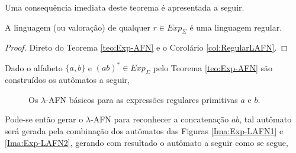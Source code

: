 Uma consequência imediata deste teorema é apresentada a seguir.

\begin{corollary}
	A linguagem (ou valoração) de qualquer $r \in Exp_\Sigma$ é uma linguagem regular.
\end{corollary}

\begin{proof}
	Direto do Teorema \ref{teo:Exp-AFN} e o Corolário \ref{col:RegularLAFN}.
\end{proof}

\begin{example}\label{exe:Expressao-AFN}
	Dado o alfabeto $\{a,b\}$ e $(ab)^* \in Exp_\Sigma$  pelo Teorema \ref{teo:Exp-AFN} são construídos os autômatos a seguir,
	
	\begin{figure}[h]
		\centering
		\hfill
		\caption{Os $\lambda$-AFN básicos para as expressões regulares primitivas $a$ e $b$.}
		\label{fig:LAFD-basicos1}
	\end{figure}
	
	Pode-se então gerar o $\lambda$-AFN para reconhecer a concatenação $ab$, tal autômato será gerada pela combinação dos autômatos das Figuras \ref{Ima:Exp-LAFN1} e \ref{Ima:Exp-LAFN2}, gerando com resultado o autômato a seguir como se segue,
	

\end{example}
